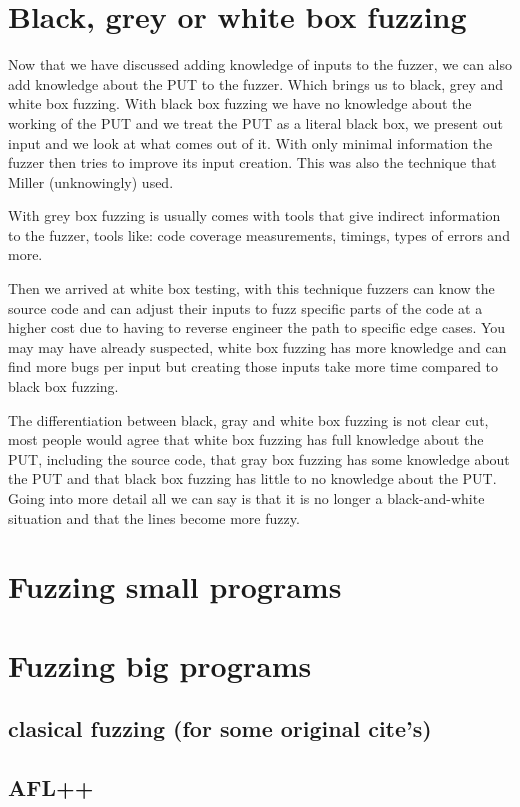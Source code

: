 \section{Black, grey or white box fuzzing}
Now that we have discussed adding knowledge of inputs to the fuzzer, we can also add knowledge about the PUT to the fuzzer. Which brings us to black, grey and white box fuzzing. With black box fuzzing we have no knowledge about the working of the PUT and we treat the PUT as a literal black box, we present out input and we look at what comes out of it. With only minimal information the fuzzer then tries to improve its input creation. This was also the technique that Miller (unknowingly) used.
 
With grey box fuzzing is usually comes with tools that give indirect information to the fuzzer, tools like: code coverage measurements, timings, types of errors and more.

Then we arrived at white box testing, with this technique fuzzers can know the source code and can adjust their inputs to fuzz specific parts of the code at a higher cost due to having to reverse engineer the path to specific edge cases. You may may have already suspected, white box fuzzing has more knowledge and can find more bugs per input but creating those inputs take more time compared to black box fuzzing.

The differentiation between black, gray and white box fuzzing is not clear cut, most people would agree that white box fuzzing has full knowledge about the PUT, including the source code, that gray box fuzzing has some knowledge about the PUT and that black box fuzzing has little to no knowledge about the PUT. Going into more detail all we can say is that it is no longer a black-and-white situation and that the lines become more fuzzy. 


\section{Fuzzing small programs} 
\section{Fuzzing big programs}

\subsection{clasical fuzzing (for some original cite's)}
\subsection{AFL++}
